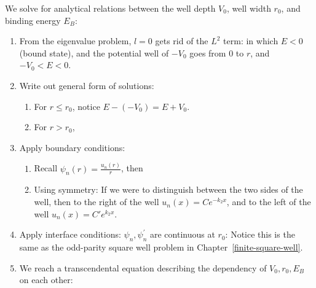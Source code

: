 \documentclass{school-22.101-notes}
\begin{document}
We solve for analytical relations between the well depth $V_0$, well width $r_0$, and binding energy $E_B$: 
\begin{enumerate}
\item From the eigenvalue problem, $l=0$ gets rid of the $L^2$ term:
in which $E<0$ (bound state), and the potential well of $-V_0$ goes from $0$ to $r$, and $-V_0 < E < 0$. 

\item Write out general form of solutions:  
\begin{enumerate}
\item For $r \le r_0$, notice $E - (-V_0) = E + V_0$. 

\item For $r > r_0$, 
\end{enumerate}

\item Apply boundary conditions:
\begin{enumerate}
\item Recall $\psi_n (r) = \frac{u_n(r)}{r}$, then 

\item Using symmetry:
If we were to distinguish between the two sides of the well, then to the right of the well $u_n(x) = C e^{-k_2 x}$, and to the left of the well $u_n (x) = C' e^{k_2 x}$. 
\end{enumerate}

\item Apply interface conditions: $\psi_n, \psi^{\prime}_n$ are continuous at $r_0$: 
Notice this is the same as the odd-parity square well problem in Chapter~\ref{finite-square-well}. 


\item We reach a transcendental equation describing the dependency of $V_0, r_0, E_B$ on each other:


\end{enumerate}
\end{document}
